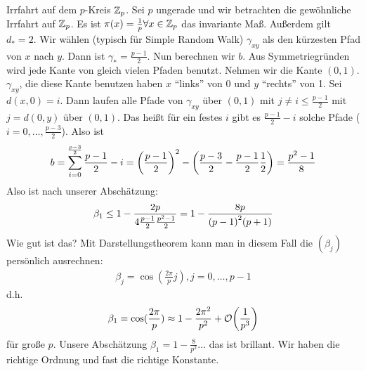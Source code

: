 %
%
\begin{beispiel}
	Irrfahrt auf dem $p$-Kreis $\mathbb{Z}_p$. Sei $p$ ungerade und wir betrachten die gewöhnliche Irrfahrt auf $\mathbb{Z}_p$. Es ist $\pi(x) = \frac{1}{p} \forall x \in \mathbb{Z}_p$ das invariante Maß.  Außerdem gilt $d_* = 2$. Wir wählen (typisch für Simple Random Walk) $\gamma_{xy}$ als den kürzesten Pfad von $x$ nach $y$. Dann ist $\gamma_* = \frac{p-1}{2}$. Nun berechnen wir $b$. Aus Symmetriegründen wird jede Kante von gleich vielen Pfaden benutzt. Nehmen wir die Kante $(0,1)$.  $\gamma_{xy}$, die diese Kante benutzen haben $x$ \enquote{links} von $0$ und $y$ \enquote{rechts} von 1. Sei $d(x,0) = i$. Dann laufen alle Pfade von $\gamma_{xy}$ über $(0,1)$ mit $j \neq i \leq \frac{p-1}{2}$ mit $j = d(0,y)$ über $(0,1)$. Das heißt für ein festes $i$ gibt es $\frac{p-1}{2} - i$ solche Pfade ($i = 0, \dots, \frac{p-3}{2}$). Also ist 
	\begin{align}
		b = \sum\limits_{i = 0}^{\frac{p-3}{2}} \frac{p-1}{2} -i = \left(\frac{p-1}{2}\right)^2 - \left(\frac{p-3}{2} - \frac{p-1}{2} \frac{1}{2}\right) = \frac{p^2-1}{8}
	\end{align}
	Also ist nach unserer Abschätzung:
	\begin{align}
		\beta_1 \leq 1-\frac{2p}{4 \frac{p-1}{2} \frac{p^2-1}{2} } = 1 - \frac{8p}{\enb{p-1}^2 (p+1) }
	\end{align}
	Wie gut ist das? Mit Darstellungstheorem kann man in diesem Fall die $(\beta_j)$ persönlich ausrechnen:
	\begin{align}
		\beta_j = \cos(\frac{2\pi}{p}j), j = 0, \dots, p-1
	\end{align}
	d.h.
	\begin{align}
		\beta_1 = \cos(\frac{2\pi}{p}) \approx 1 - \frac{2 \pi^2}{p^2} + \mathcal{O}\enb{\frac{1}{p^3}}
	\end{align}
	für große $p$. Unsere Abschätzung $\beta_1 = 1 - \frac{8}{p^2}\dots$ das ist brillant. Wir haben die richtige Ordnung und fast die richtige Konstante.
\end{beispiel}

